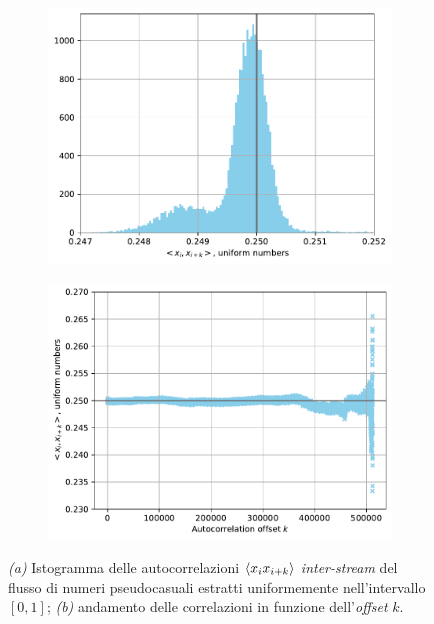 \begin{figure}[t]
\centering
\begin{subfigure}{.5\textwidth}
  \centering
  \includegraphics[scale=0.5]{graphs/CorrelationTests_UniformInterStreamAutocorrelationHistogram.pdf}
  \caption{}
  \label{fig:inter_uni_autocorr_histo}
\end{subfigure}%
\begin{subfigure}{.5\textwidth}
  \centering
  \includegraphics[scale=0.5]{graphs/CorrelationTests_UniformInterStreamAutocorrelationVsOffset.pdf}
  \caption{}
  \label{fig:inter_uni_autocorr_offset}
\end{subfigure}
\caption[Istogramma e andamento delle autocorrelazioni \textit{inter-stream} del flusso di numeri pseudocasuali estratti uniformemente nell'intervallo unitario.]{\textit{(a)} Istogramma delle autocorrelazioni $\braket{x_ix_{i+k}}$ \textit{inter-stream} del flusso di numeri pseudocasuali estratti uniformemente nell'intervallo $[0,1]$; \textit{(b)} andamento delle correlazioni in funzione dell'\textit{offset} $k$.}
\end{figure}

